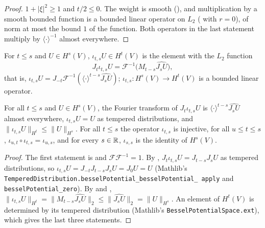 \begin{proof}
\leanok
$1 + |\xi|^2 \geq 1$ and $t/2 \leq 0$. The weight is smooth (),
and multiplication by a smooth bounded function is a bounded linear operator on $L_2$
( with $r = 0$), of norm at most the bound $1$ of the function. Both
operators in the last statement multiply by $\langle \cdot \rangle^{-1}$ almost everywhere.
\end{proof}

\begin{definition}
\label{def:sobolev-inclusion}
\leanok
{}
For $t \leq s$ and $U \in H^s(V)$, $\iota_{t,s} U \in H^t(V)$ is the element with the $L_2$
function
\[
  J_t \iota_{t,s} U = \mathcal F^{-1} \bigl(M_{t-s} \widehat{J_s U}\bigr) ,
\]
that is, $\iota_{t,s} U = J_{-t} \mathcal F^{-1}(\langle \cdot \rangle^{t-s} \widehat{J_s U})$;
$\iota_{t,s} : H^s(V) \to H^t(V)$ is a bounded linear operator.
\end{definition}

\begin{lemma}
\label{lem:sobolev-inclusion}
\leanok
{}
For all $t \leq s$ and $U \in H^s(V)$, the Fourier transform of $J_t \iota_{t,s} U$ is
$\langle \cdot \rangle^{t-s} \widehat{J_s U}$ almost everywhere, $\iota_{t,s} U = U$ as tempered
distributions, and $\|\iota_{t,s} U\|_{H^t} \leq \|U\|_{H^s}$. For all $t \leq s$ the operator
$\iota_{t,s}$ is injective, for all $u \leq t \leq s$,
$\iota_{u,t} \circ \iota_{t,s} = \iota_{u,s}$, and for every $s \in \mathbb{R}$, $\iota_{s,s}$ is the
identity of $H^s(V)$.
\end{lemma}

\begin{proof}
\leanok
The first statement is  and $\mathcal F \mathcal F^{-1} = 1$. By
, $J_t \iota_{t,s} U = J_{t-s} J_s U$ as tempered
distributions, so $\iota_{t,s} U = J_{-t} J_{t-s} J_s U = J_0 U = U$ (Mathlib's
\texttt{TemperedDistribution.\allowbreak besselPotential\_\allowbreak besselPotential\_\allowbreak
apply} and \texttt{besselPotential\_\allowbreak zero}). By 
and ,
$\|\iota_{t,s} U\|_{H^t} = \|M_{t-s} \widehat{J_s U}\|_2 \leq \|\widehat{J_s U}\|_2 =
\|U\|_{H^s}$. An element of $H^t(V)$ is determined by its tempered distribution
(Mathlib's \texttt{BesselPotentialSpace.\allowbreak ext}), which gives the last three statements.
\end{proof}

